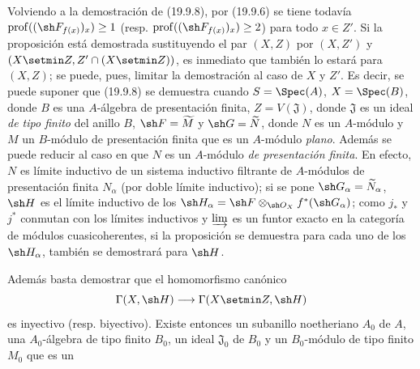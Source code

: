 Volviendo a la demostración de (19.9.8), por (19.9.6) se tiene todavía
$\operatorname{prof}((\sh F_{f(x)})_x)\geq1$
(resp. $\operatorname{prof}((\sh F_{f(x)})_x)\geq2$) para todo $x\in Z'$.
Si la proposición está demostrada sustituyendo el par $(X,Z)$ por
$(X,Z')$ y $(X\setmin Z,Z'\cap(X\setmin Z))$, es inmediato que también lo estará para
$(X,Z)$; se puede, pues, limitar la demostración al caso de $X$ y $Z'$. Es
decir, se puede suponer que (19.9.8) se demuestra cuando
$S=\Spec(A)$, $X=\Spec(B)$, donde $B$ es una $A$-álgebra de presentación
finita, $Z=V(\mathfrak J)$, donde $\mathfrak J$ es un ideal \emph{de tipo finito} del
anillo $B$, $\sh F=\widetilde M$ y $\sh G=\widetilde N$, donde $N$ es un
$A$-módulo y $M$ un $B$-módulo de presentación finita que es un $A$-módulo
\emph{plano}. Además se puede reducir al caso en que $N$ es un $A$-módulo \emph{de
presentación finita}. En efecto, $N$ es límite inductivo de un sistema inductivo
filtrante de $A$-módulos de presentación finita $N_\alpha$ (por doble límite
inductivo); si se pone $\sh G_\alpha=\widetilde{N}_\alpha$, $\sh H$ es el
límite inductivo de los $\sh H_\alpha=\sh F\otimes_{\sh O_X}f^*(\sh G_\alpha)$;
como $j_*$ y $j^*$ conmutan con los límites inductivos y
$\varinjlim$ es un funtor exacto en la categoría de módulos cuasicoherentes, si
la proposición se demuestra para cada uno de los $\sh H_\alpha$, también se
demostrará para $\sh H$.

Además basta demostrar que el homomorfismo canónico
\[
  \Gamma(X,\sh H)\longrightarrow\Gamma(X\setmin Z,\sh H)
\]
es inyectivo (resp. biyectivo). Existe entonces un subanillo noetheriano
$A_0$ de $A$, una $A_0$-álgebra de tipo finito $B_0$, un ideal
$\mathfrak J_0$ de $B_0$ y un $B_0$-módulo de tipo finito $M_0$ que es un


